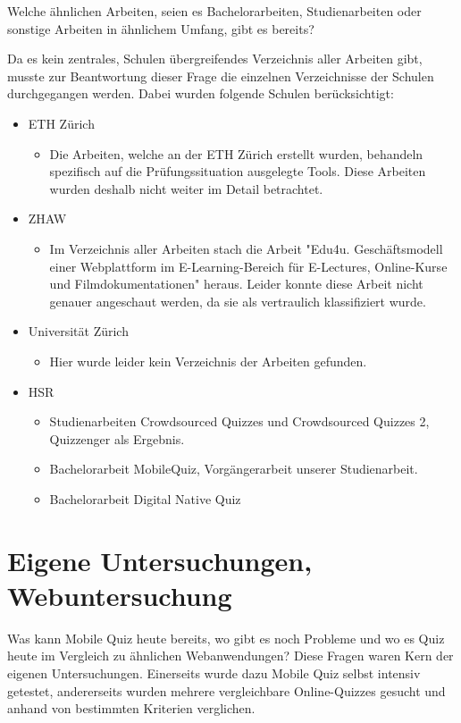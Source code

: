 Welche ähnlichen Arbeiten, seien es Bachelorarbeiten, Studienarbeiten oder sonstige Arbeiten in ähnlichem Umfang, gibt es bereits?

Da es kein zentrales, Schulen übergreifendes Verzeichnis aller Arbeiten gibt, musste zur Beantwortung dieser Frage die einzelnen Verzeichnisse der Schulen durchgegangen werden. Dabei wurden folgende Schulen berücksichtigt:
\begin{itemize}
	\item ETH Zürich
	\begin{itemize}
		\item Die Arbeiten, welche an der ETH Zürich erstellt wurden, behandeln spezifisch auf die Prüfungssituation ausgelegte Tools. Diese Arbeiten wurden deshalb nicht weiter im Detail betrachtet. 
	\end{itemize}
	\item ZHAW
	\begin{itemize}
		\item Im Verzeichnis aller Arbeiten stach die Arbeit "Edu4u. Geschäftsmodell einer Webplattform im E-Learning-Bereich für E-Lectures, Online-Kurse und Filmdokumentationen" heraus. Leider konnte diese Arbeit nicht genauer angeschaut werden, da sie als vertraulich klassifiziert wurde.
	\end{itemize}
	\item Universität Zürich
	\begin{itemize}
		\item Hier wurde leider kein Verzeichnis der Arbeiten gefunden.
	\end{itemize}
	\item HSR
	\begin{itemize}
		\item Studienarbeiten Crowdsourced Quizzes und Crowdsourced Quizzes 2, Quizzenger als Ergebnis.
		\item Bachelorarbeit MobileQuiz, Vorgängerarbeit unserer Studienarbeit.
		\item Bachelorarbeit Digital Native Quiz
	\end{itemize}
\end{itemize}

\section{Eigene Untersuchungen, Webuntersuchung}


Was kann Mobile Quiz heute bereits, wo gibt es noch Probleme und wo es Quiz heute im Vergleich zu ähnlichen Webanwendungen? Diese Fragen waren Kern der eigenen Untersuchungen. Einerseits wurde dazu Mobile Quiz selbst intensiv getestet, andererseits wurden mehrere vergleichbare Online-Quizzes gesucht und anhand von bestimmten Kriterien verglichen.


